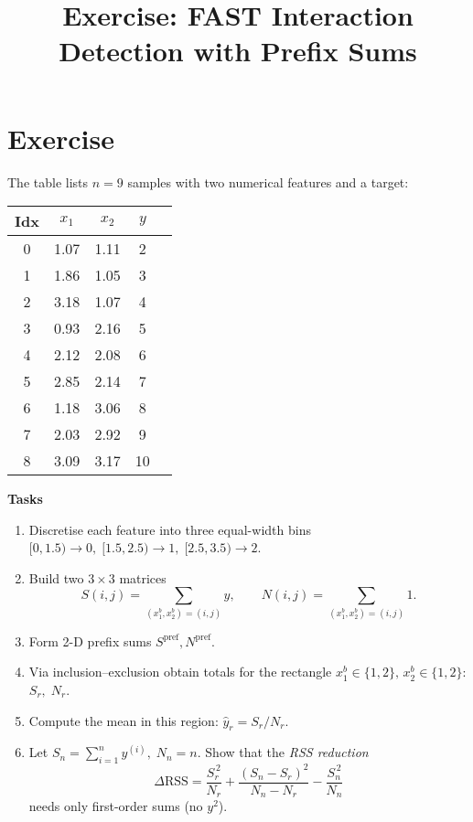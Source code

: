 \documentclass{article}
\title{Exercise: FAST Interaction Detection with Prefix Sums}
\date{}
\begin{document}
\author{}
\maketitle

\section*{Exercise}
The table lists \(n=9\) samples with two numerical features and a target:

\begin{center}
\begin{tabular}{ccccc}
\toprule
Idx & $x_1$ & $x_2$ & $y$ \\ \midrule
0 & 1.07 & 1.11 &  2 \\
1 & 1.86 & 1.05 &  3\\
2 & 3.18 & 1.07 &  4 \\
3 & 0.93 & 2.16 &  5 \\
4 & 2.12 & 2.08 &  6 \\
5 & 2.85 & 2.14 &  7 \\
6 & 1.18 & 3.06 &  8 \\
7 & 2.03 & 2.92 &  9 \\
8 & 3.09 & 3.17 & 10 \\ \bottomrule
\end{tabular}

\end{center}

\bigskip
\textbf{Tasks}
\begin{enumerate}
\item Discretise each feature into three equal-width bins  
      \([0,1.5)\!\to\!0,\;[1.5,2.5)\!\to\!1,\;[2.5,3.5)\!\to\!2\).

\item Build two \(3\times3\) matrices
      \[
        S(i,j)=\!\!\sum_{(x_1^b,x_2^b)=(i,j)} \! y,
        \qquad
        N(i,j)=\!\!\sum_{(x_1^b,x_2^b)=(i,j)} \! 1 .
      \]

\item Form 2-D prefix sums
      \(S^{\mathrm{pref}},N^{\mathrm{pref}}\).

\item Via inclusion–exclusion obtain totals for the rectangle  
      \(x_1^b\!\in\!\{1,2\},\,x_2^b\!\in\!\{1,2\}\):  
      \(S_r,\;N_r\).

\item Compute the mean in this region:
      \(\hat y_r = S_r/N_r\).

\item Let \(S_n=\sum_{i=1}^n y^{(i)},\;N_n=n\).  
      Show that the \emph{RSS reduction}
      \[
        \Delta\text{RSS}
          = \frac{S_r^{\,2}}{N_r}
            +\frac{(S_n-S_r)^{2}}{N_n-N_r}
            -\frac{S_n^{\,2}}{N_n}
      \]
      needs only first-order sums (no \(y^2\)).
\end{enumerate}
\end{document}
